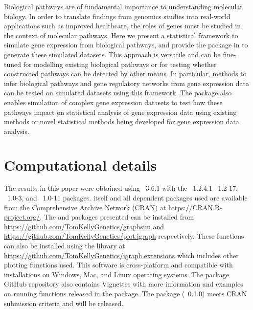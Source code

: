 \documentclass[article, shortnames]{jss}
\begin{document}
\begin{leftbar}
Biological pathways are of fundamental importance to understanding molecular biology. In order to translate findings from genomics studies into real-world applications such as improved healthcare, the roles of genes must be studied in the context of molecular pathways. Here we present a statistical framework to simulate gene expression from biological pathways, and provide the  package in  to generate these simulated datasets. This approach is versatile and can be fine-tuned for modelling existing biological pathways or for testing whether constructed pathways can be detected by other means. In particular, methods to infer biological pathways and gene regulatory networks from gene expression data can be tested on simulated datasets using this framework. The package also enables simulation of complex gene expression datasets to test how these pathways impact on statistical analysis of gene expression data using existing methods or novel statistical methods being developed for gene expression data analysis. 
\end{leftbar}



\section*{Computational details}

\iffalse
\begin{leftbar}
If necessary or useful, information about certain computational details
such as version numbers, operating systems, or compilers could be included
in an unnumbered section. Also, auxiliary packages (say, for visualizations,
maps, tables, \dots) that are not cited in the main text can be credited here.
\end{leftbar}
\fi

The results in this paper were obtained using
~3.6.1 with the
~1.2.4.1 ~1.2-17, ~1.0-3, and ~1.0-11 packages.  itself
and all dependent packages used are available from the Comprehensive
 Archive Network (CRAN) at
\url{https://CRAN.R-project.org/}. 
The  and  packages presented can be installed from \url{https://github.com/TomKellyGenetics/graphsim} 
and \url{https://github.com/TomKellyGenetics/plot.igraph} respectively. These functions can also be installed using the  library at \url{https://github.com/TomKellyGenetics/igraph.extensions} which includes other plotting functions used. This software is cross-platform and compatible with  installations on Windows, Mac, and Linux operating systems. The package GitHub repository also contains Vignettes with more information and examples on running functions released in the  package. The package (~0.1.0) meets CRAN submission criteria and will be released.
\end{document}
